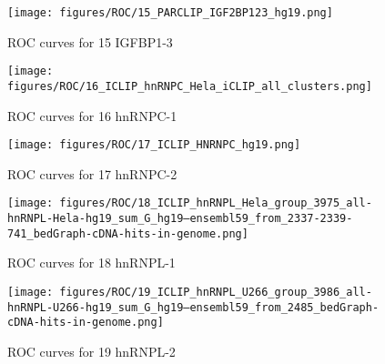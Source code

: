 \documentclass[11pt]{article}
\begin{document}
    
    
    \begin{figure}
        \begin{center}
            \texttt{[image: figures/ROC/15\_PARCLIP\_IGF2BP123\_hg19.png]}
            \caption{ROC curves for 15 IGFBP1-3}
            \label{fig:ROC15 IGFBP1-3}
        \end{center}
    \end{figure}

    
    
    \begin{figure}
        \begin{center}
            \texttt{[image: figures/ROC/16\_ICLIP\_hnRNPC\_Hela\_iCLIP\_all\_clusters.png]}
            \caption{ROC curves for 16 hnRNPC-1}
            \label{fig:ROC16 hnRNPC-1}
        \end{center}
    \end{figure}

    
    
    \begin{figure}
        \begin{center}
            \texttt{[image: figures/ROC/17\_ICLIP\_HNRNPC\_hg19.png]}
            \caption{ROC curves for 17 hnRNPC-2}
            \label{fig:ROC17 hnRNPC-2}
        \end{center}
    \end{figure}

    
    
    \begin{figure}
        \begin{center}
            \texttt{[image: figures/ROC/18\_ICLIP\_hnRNPL\_Hela\_group\_3975\_all-hnRNPL-Hela-hg19\_sum\_G\_hg19--ensembl59\_from\_2337-2339-741\_bedGraph-cDNA-hits-in-genome.png]}
            \caption{ROC curves for 18 hnRNPL-1}
            \label{fig:ROC18 hnRNPL-1}
        \end{center}
    \end{figure}

    
    
    \begin{figure}
        \begin{center}
            \texttt{[image: figures/ROC/19\_ICLIP\_hnRNPL\_U266\_group\_3986\_all-hnRNPL-U266-hg19\_sum\_G\_hg19--ensembl59\_from\_2485\_bedGraph-cDNA-hits-in-genome.png]}
            \caption{ROC curves for 19 hnRNPL-2}
            \label{fig:ROC19 hnRNPL-2}
        \end{center}
    \end{figure}
\end{document}
